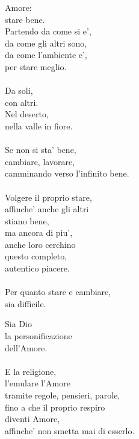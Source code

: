 \begin{haiku}
    Amore: \\
    stare bene.\\
    Partendo da come si e',\\
    da come gli altri sono,\\
    da come l'ambiente e',\\
    per stare meglio.\\
    \leavevmode\\
    Da soli,\\
    con altri.\\
    Nel deserto,\\
    nella valle in fiore.\\
    \leavevmode\\
    Se non si sta' bene,\\
    cambiare, lavorare,\\
    camminando verso l'infinito bene.\\
    \leavevmode\\
    Volgere il proprio stare,\\
    affinche' anche gli altri\\
    stiano bene,\\
    ma ancora di piu',\\
    anche loro cerchino \\
    questo completo,\\
    autentico piacere.\\
    \leavevmode\\
    Per quanto stare e cambiare,\\
    sia difficile.\\
\end{haiku}

\begin{haiku}
    Sia Dio\\
    la personificazione\\
    dell'Amore.\\
    \leavevmode\\
    E la religione,\\
    l'emulare l'Amore\\
    tramite regole, pensieri, parole,\\
    fino a che il proprio respiro\\
    diventi Amore,\\
    affinche' non smetta mai di esserlo.\\
\end{haiku}


